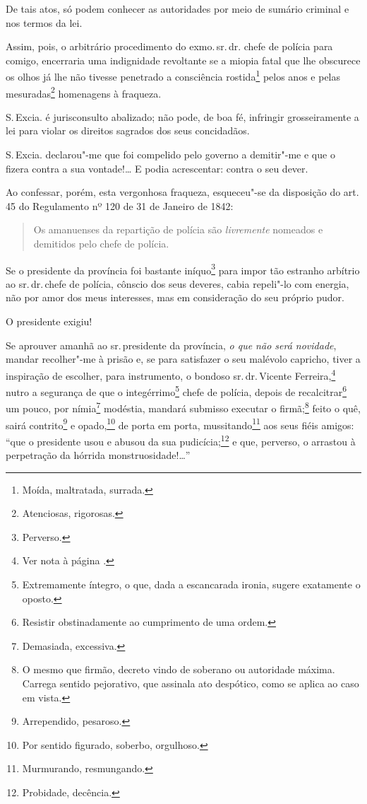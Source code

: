 De tais atos, só podem conhecer as autoridades por meio de sumário
criminal e nos termos da lei.

Assim, pois, o arbitrário procedimento do exmo.\,sr.\,dr. chefe de polícia
para comigo, encerraria uma indignidade revoltante se a miopia fatal que
lhe obscurece os olhos já lhe não tivesse penetrado a consciência
rostida\footnote{Moída, maltratada, surrada.} pelos anos e pelas
mesuradas\footnote{Atenciosas, rigorosas.} homenagens à fraqueza.

S.\,Excia. é jurisconsulto abalizado; não pode, de boa fé, infringir
grosseiramente a lei para violar os direitos sagrados dos seus
concidadãos.

S.\,Excia. declarou"-me que foi compelido pelo governo a demitir"-me e que
o fizera contra a sua vontade!\ldots{} E podia acrescentar: contra o seu
dever.

Ao confessar, porém, esta vergonhosa fraqueza, esqueceu"-se da disposição
do art. 45 do Regulamento nº 120 de 31 de Janeiro de 1842:

\begin{quote}
Os amanuenses da repartição de polícia são \emph{livremente} nomeados e
demitidos pelo chefe de polícia.
\end{quote}

Se o presidente da província foi bastante iníquo\footnote{Perverso.}
para impor tão estranho arbítrio ao sr.\,dr.\,chefe de polícia, cônscio
dos seus deveres, cabia repeli"-lo com energia, não por amor dos meus
interesses, mas em consideração do seu próprio pudor.

O presidente exigiu!

Se aprouver amanhã ao sr.\,presidente da província, \emph{o que não será
novidade}, mandar recolher"-me à prisão e, se para satisfazer o seu
malévolo capricho, tiver a inspiração de escolher, para instrumento, o
bondoso sr.\,dr.\,Vicente Ferreira,\footnote{Ver nota à página \pageref{bueno}.} nutro a segurança de que o
integérrimo\footnote{Extremamente íntegro, o que, dada a escancarada
  ironia, sugere exatamente o oposto.} chefe de polícia, depois de
recalcitrar\footnote{Resistir obstinadamente ao cumprimento de uma
  ordem.} um pouco, por nímia\footnote{Demasiada, excessiva.}
modéstia, mandará submisso executar o firmã;\footnote{O mesmo que
  firmão, decreto vindo de soberano ou autoridade máxima. Carrega
  sentido pejorativo, que assinala ato despótico, como se aplica ao caso
  em vista.} feito o quê, sairá contrito\footnote{Arrependido,
  pesaroso.} e opado,\footnote{Por sentido figurado, soberbo,
  orgulhoso.} de porta em porta, mussitando\footnote{Murmurando,
  resmungando.} aos seus fiéis amigos: ``que o presidente usou e abusou
da sua pudicícia;\footnote{Probidade, decência.} e que, perverso, o
arrastou à perpetração da hórrida monstruosidade!\ldots{}''

